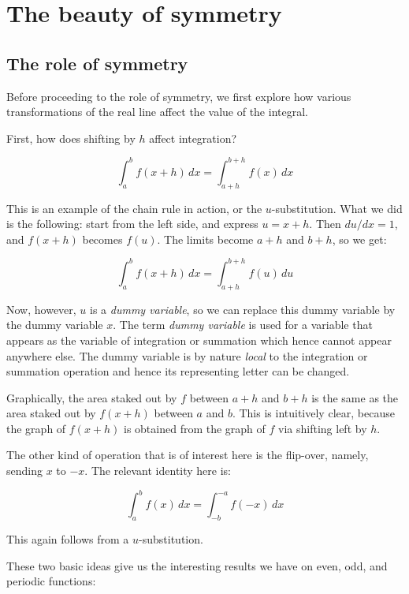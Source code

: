\documentclass{amsart}
\begin{document}
\section{The beauty of symmetry}

\subsection{The role of symmetry}

Before proceeding to the role of symmetry, we first explore how
various transformations of the real line affect the value of the
integral.

First, how does shifting by $h$ affect integration? 

$$\int_a^b f(x + h) \, dx = \int_{a + h}^{b+h} f(x) \, dx$$

This is an example of the chain rule in action, or the
$u$-substitution. What we did is the following: start from the left
side, and express $u = x + h$. Then $du/dx = 1$, and $f(x + h)$
becomes $f(u)$. The limits become $a + h$ and $b + h$, so we get:

$$\int_a^b f(x + h) \, dx = \int_{a + h}^{b+h} f(u) \, du$$

Now, however, $u$ is a {\em dummy variable}, so we can replace this
dummy variable by the dummy variable $x$. The term {\em dummy
variable} is used for a variable that appears as the variable of
integration or summation which hence cannot appear anywhere else. The
dummy variable is by nature {\em local} to the integration or
summation operation and hence its representing letter can be changed.

Graphically, the area staked out by $f$ between $a +
h$ and $b + h$ is the same as the area staked out by $f(x + h)$
between $a$ and $b$. This is intuitively clear, because the graph of
$f(x + h)$ is obtained from the graph of $f$ via shifting left by $h$.

The other kind of operation that is of interest here is the flip-over,
namely, sending $x$ to $-x$. The relevant identity here is:

$$\int_a^b f(x) \, dx = \int_{-b}^{-a} f(-x) \, dx$$

This again follows from a $u$-substitution.

These two basic ideas give us the interesting results we have on even,
odd, and periodic functions:
\end{document}
